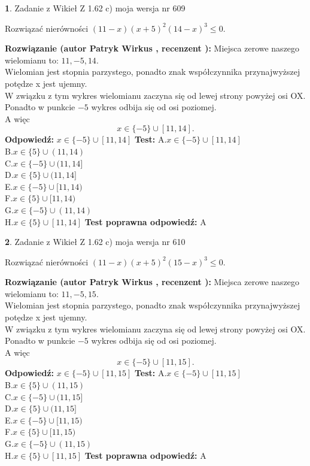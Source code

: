 \documentclass[12pt, a4paper]{article}
\theoremstyle{definition} %
\newtheorem{zad}{}
\newcommand{\zadStart}[1]{\begin{zad}#1\newline}
\newcommand{\zadStop}{\end{zad}}
\newcommand{\rozwStart}[2]{\noindent \textbf{Rozwiązanie (autor #1 , recenzent #2): }\newline}
\newcommand{\rozwStop}{\newline}
\newcommand{\odpStart}{\noindent \textbf{Odpowiedź:}\newline}
\newcommand{\odpStop}{\newline}
\newcommand{\testStart}{\noindent \textbf{Test:}\newline}
\newcommand{\testStop}{\newline}
\newcommand{\kluczStart}{\noindent \textbf{Test poprawna odpowiedź:}\newline}
\newcommand{\kluczStop}{\newline}
\begin{document}
\zadStart{Zadanie z Wikieł Z 1.62 c) moja wersja nr 609}

Rozwiązać nierówności $(11-x)(x+5)^{2}(14-x)^{3}\le0$.
\zadStop
\rozwStart{Patryk Wirkus}{}
Miejsca zerowe naszego wielomianu to: $11, -5, 14$.\\
Wielomian jest stopnia parzystego, ponadto znak współczynnika przy\linebreak najwyższej potędze x jest ujemny.\\ W związku z tym wykres wielomianu zaczyna się od lewej strony powyżej osi OX.\\
Ponadto w punkcie $-5$ wykres odbija się od osi poziomej.\\
A więc $$x \in \{-5\} \cup [11,14].$$
\rozwStop
\odpStart
$x \in \{-5\} \cup [11,14]$
\odpStop
\testStart
A.$x \in \{-5\} \cup [11,14]$\\
B.$x \in \{5\} \cup (11,14)$\\
C.$x \in \{-5\} \cup (11,14]$\\
D.$x \in \{5\} \cup (11,14]$\\
E.$x \in \{-5\} \cup [11,14)$\\
F.$x \in \{5\} \cup [11,14)$\\
G.$x \in \{-5\} \cup (11,14)$\\
H.$x \in \{5\} \cup [11,14]$
\testStop
\kluczStart
A
\kluczStop



\zadStart{Zadanie z Wikieł Z 1.62 c) moja wersja nr 610}

Rozwiązać nierówności $(11-x)(x+5)^{2}(15-x)^{3}\le0$.
\zadStop
\rozwStart{Patryk Wirkus}{}
Miejsca zerowe naszego wielomianu to: $11, -5, 15$.\\
Wielomian jest stopnia parzystego, ponadto znak współczynnika przy\linebreak najwyższej potędze x jest ujemny.\\ W związku z tym wykres wielomianu zaczyna się od lewej strony powyżej osi OX.\\
Ponadto w punkcie $-5$ wykres odbija się od osi poziomej.\\
A więc $$x \in \{-5\} \cup [11,15].$$
\rozwStop
\odpStart
$x \in \{-5\} \cup [11,15]$
\odpStop
\testStart
A.$x \in \{-5\} \cup [11,15]$\\
B.$x \in \{5\} \cup (11,15)$\\
C.$x \in \{-5\} \cup (11,15]$\\
D.$x \in \{5\} \cup (11,15]$\\
E.$x \in \{-5\} \cup [11,15)$\\
F.$x \in \{5\} \cup [11,15)$\\
G.$x \in \{-5\} \cup (11,15)$\\
H.$x \in \{5\} \cup [11,15]$
\testStop
\kluczStart
A
\kluczStop
\end{document}
